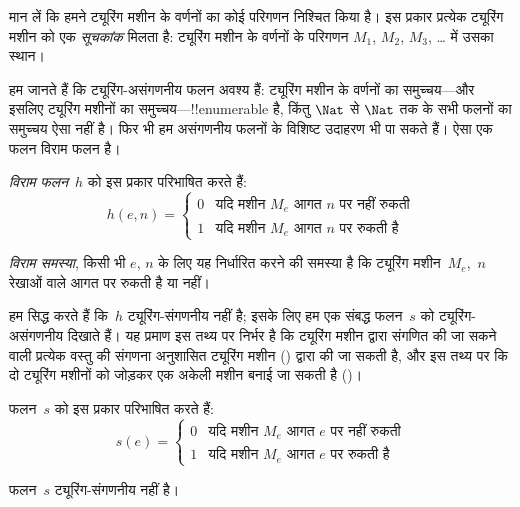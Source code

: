 \documentclass[../../../include/open-logic-section]{subfiles}
\begin{document}

\begin{explain}
मान लें कि हमने ट्यूरिंग मशीन के वर्णनों का कोई परिगणन निश्चित किया है।
इस प्रकार प्रत्येक ट्यूरिंग मशीन को एक \emph{सूचकांक} मिलता है: ट्यूरिंग
मशीन के वर्णनों के परिगणन $M_1$, $M_2$, $M_3$, \dots{} में उसका स्थान।

हम जानते हैं कि ट्यूरिंग-असंगणनीय फलन अवश्य हैं: ट्यूरिंग मशीन के
वर्णनों का समुच्चय---और इसलिए ट्यूरिंग मशीनों का समुच्चय---!!{enumerable}
है, किंतु $\Nat$ से $\Nat$ तक के सभी फलनों का समुच्चय ऐसा नहीं है। फिर
भी हम असंगणनीय फलनों के विशिष्ट उदाहरण भी पा सकते हैं। ऐसा एक फलन विराम
फलन है।
\end{explain}

\begin{defn}[विराम फलन]
 \emph{विराम फलन}~$h$ को इस प्रकार परिभाषित करते हैं:
\[
h(e,n) =
\begin{cases}
  \text{0} & \text{यदि मशीन~$M_e$ आगत $n$ पर नहीं रुकती} \\
  \text{1} & \text{यदि मशीन~$M_e$ आगत $n$ पर रुकती है}
\end{cases}
\]
\end{defn}

\begin{defn}[विराम समस्या]
\emph{विराम समस्या}, किसी भी $e$, $n$ के लिए यह निर्धारित करने की समस्या
है कि ट्यूरिंग मशीन~$M_e$,~$n$ रेखाओं वाले आगत पर रुकती है या नहीं।
\end{defn}

\begin{explain}
हम सिद्ध करते हैं कि~$h$ ट्यूरिंग-संगणनीय नहीं है; इसके लिए हम एक
संबद्ध फलन~$s$ को ट्यूरिंग-असंगणनीय दिखाते हैं। यह प्रमाण इस तथ्य पर
निर्भर है कि ट्यूरिंग
मशीन द्वारा संगणित की जा सकने वाली प्रत्येक वस्तु की संगणना अनुशासित
ट्यूरिंग मशीन () द्वारा की जा सकती है, और इस तथ्य
पर कि दो ट्यूरिंग मशीनों को जोड़कर एक अकेली मशीन बनाई जा सकती है
()।
\end{explain}

\begin{defn} फलन~$s$ को इस प्रकार परिभाषित करते हैं:
\[
s(e) =
\begin{cases}
  \text{0} & \text{यदि मशीन~$M_e$ आगत $e$ पर नहीं रुकती} \\
  \text{1} & \text{यदि मशीन~$M_e$ आगत $e$ पर रुकती है}
\end{cases}
\]
\end{defn}

\begin{lem}
फलन~$s$ ट्यूरिंग-संगणनीय नहीं है।
\end{lem}
\end{document}
